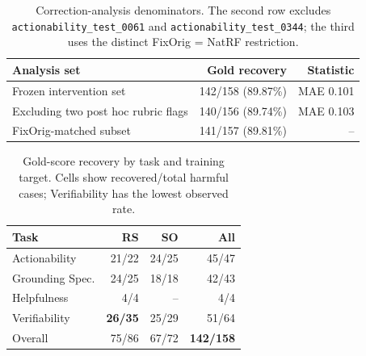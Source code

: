 \begin{table}[!tp]
\centering
\captionsetup{font=normalsize,skip=2pt}
\small
\setlength{\tabcolsep}{8pt}
\renewcommand{\arraystretch}{1.05}

\begin{tabular}{@{}lrr@{}}
\toprule
Analysis set & Gold recovery & Statistic \\
\midrule
Frozen intervention set
& 142/158 (89.87\%)
& MAE 0.101 \\

Excluding two post hoc rubric flags
& 140/156 (89.74\%)
& MAE 0.103 \\

FixOrig-matched subset
& 141/157 (89.81\%)
& -- \\
\bottomrule
\end{tabular}

\caption{Correction-analysis denominators. The second row excludes
\texttt{actionability\_test\_0061} and \texttt{actionability\_test\_0344};
the third uses the distinct FixOrig = NatRF restriction.}
\label{tab:correction-analysis-sets}
\end{table}

\begin{table}[!tp]
\centering
\captionsetup{font=normalsize,skip=2pt}
\small
\setlength{\tabcolsep}{8pt}
\renewcommand{\arraystretch}{1.05}

\begin{tabular}{@{}lrrr@{}}
\toprule
Task & RS & SO & All \\
\midrule
Actionability
& 21/22 & 24/25 & 45/47 \\

Grounding Spec.
& 24/25 & 18/18 & 42/43 \\

Helpfulness
& 4/4 & -- & 4/4 \\

Verifiability
& \textbf{26/35} & 25/29 & 51/64 \\
\midrule
Overall
& 75/86 & 67/72 & \textbf{142/158} \\
\bottomrule
\end{tabular}

\caption{Gold-score recovery by task and training target. Cells show
recovered/total harmful cases; Verifiability has the lowest observed rate.}
\label{tab:full-correction-task}
\end{table}

